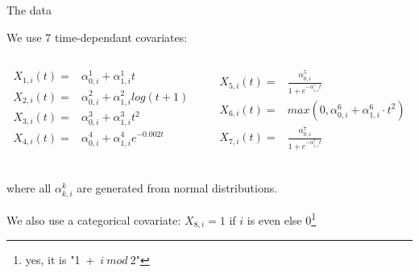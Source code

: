 \documentclass{beamer}
\begin{document}
\begin{frame}{The data}

	We use 7 time-dependant covariates:
	
	\begin{columns}
		\begin{column}{0.5\textwidth}	
			 \begin{align*}
		 X_{1,i}(t) = & \alpha_{0,i}^1 + \alpha_{1,i}^1 t \\ 
		 X_{2,i}(t) = & \alpha_{0,i}^2 + \alpha_{1,i}^2 log(t+1) \\ 
		 X_{3,i}(t) = & \alpha_{0,i}^3 + \alpha_{1,i}^3 t^2 \\ 
		 X_{4,i}(t) = & \alpha_{0,i}^4 + \alpha_{1,i}^4 e^{-0.002t} \\ 
		 	\end{align*}
		 \end{column}
		 \begin{column}{0.5\textwidth}	
			 \begin{align*}	
		 X_{5,i}(t) = & \frac{\alpha_{0,i}^5}{1+e^{-\alpha_{1,i}^5 t}} \\ 
		 X_{6,i}(t) = & max(0, \alpha_{0,i}^6 + \alpha_{1,i}^6 \cdot t^2) \\ 
		 X_{7,i}(t) = & \frac{\alpha_{0,i}^7}{1+e^{-\alpha_{1,i}^7 t}} \\ 
			 \end{align*}
		 \end{column}
	\end{columns}		 

	where all $\alpha_{k,i}^k$ are generated from normal distributions.

	\bigskip

	We also use a categorical covariate: $X_{8,i} = 1$ if $i$ is even else $0$\footnote{yes, it is "1~+~$i~mod~ 2$"}

\end{frame}
\end{document}
